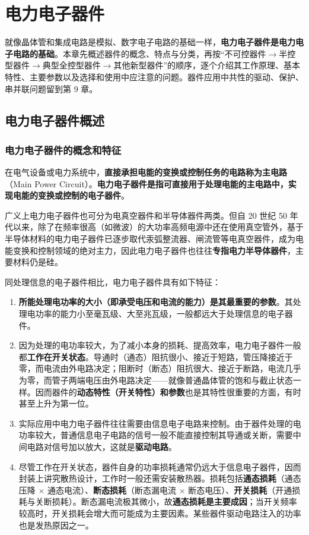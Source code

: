 \chapter{电力电子器件}

就像晶体管和集成电路是模拟、数字电子电路的基础一样，\textbf{电力电子器件是电力电子电路的基础}。本章先概述器件的概念、特点与分类，再按“不可控器件$\rightarrow$半控型器件$\rightarrow$典型全控型器件$\rightarrow$其他新型器件”的顺序，逐个介绍其工作原理、基本特性、主要参数以及选择和使用中应注意的问题。器件应用中共性的驱动、保护、串并联问题留到第 9 章。

\section{电力电子器件概述}

\subsection{电力电子器件的概念和特征}

在电气设备或电力系统中，\textbf{直接承担电能的变换或控制任务的电路称为主电路}（Main Power Circuit）。\textbf{电力电子器件是指可直接用于处理电能的主电路中，实现电能的变换或控制的电子器件}。

广义上电力电子器件也可分为电真空器件和半导体器件两类。但自 20 世纪 50 年代以来，除了在频率很高（如微波）的大功率高频电源中还在使用真空管外，基于半导体材料的电力电子器件已逐步取代汞弧整流器、闸流管等电真空器件，成为电能变换和控制领域的绝对主力，因此电力电子器件也往往\textbf{专指电力半导体器件}，主要材料仍是硅。

同处理信息的电子器件相比，电力电子器件具有如下特征：

\begin{enumerate}
  \item \textbf{所能处理电功率的大小（即承受电压和电流的能力）是其最重要的参数}。其处理电功率的能力小至毫瓦级、大至兆瓦级，一般都远大于处理信息的电子器件。
  \item 因为处理的电功率较大，为了减小本身的损耗、提高效率，电力电子器件一般都\textbf{工作在开关状态}。导通时（通态）阻抗很小、接近于短路，管压降接近于零，而电流由外电路决定；阻断时（断态）阻抗很大、接近于断路，电流几乎为零，而管子两端电压由外电路决定——就像普通晶体管的饱和与截止状态一样。因而器件的\textbf{动态特性（开关特性）和参数}也是其特性很重要的方面，有时甚至上升为第一位。
  \item 实际应用中电力电子器件往往需要由信息电子电路来控制。由于器件处理的电功率较大，普通信息电子电路的信号一般不能直接控制其导通或关断，需要中间电路对信号加以放大，这就是\textbf{驱动电路}。
  \item 尽管工作在开关状态，器件自身的功率损耗通常仍远大于信息电子器件，因而封装上讲究散热设计，工作时一般还需安装散热器。损耗包括\textbf{通态损耗}（通态压降 $\times$ 通态电流）、\textbf{断态损耗}（断态漏电流 $\times$ 断态电压）、\textbf{开关损耗}（开通损耗与关断损耗）。断态漏电流极其微小，故\textbf{通态损耗是主要成因}；当开关频率较高时，开关损耗会增大而可能成为主要因素。某些器件驱动电路注入的功率也是发热原因之一。
\end{enumerate}

